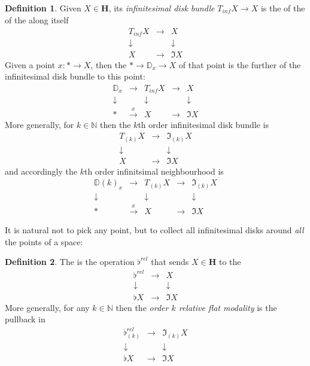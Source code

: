 \documentclass[12pt,titlepage]{article}
\newcommand{\itexarray}[1]{\begin{matrix}#1\end{matrix}}
\theoremstyle{plain}
\theoremstyle{definition}
\newtheorem{defn}{Definition}
\theoremstyle{remark}
\begin{document}
\begin{defn}
\label{InfinitesimalDiskBundle}\hypertarget{InfinitesimalDiskBundle}{}
Given $X \in \mathbf{H}$, its \emph{infinitesimal disk bundle} $T_{inf} X\to X$ is the  of the  of the  along itself
\begin{displaymath}
\itexarray{
T_{inf} X &\stackrel{}{\longrightarrow}& X
\\
\downarrow && \downarrow
\\
X &\longrightarrow& \Im X
}
\end{displaymath}
Given a point $x \colon  \ast \to X$, then the  $\ast \to \mathbb{D}_x \to X$ of that point is the further  of the infinitesimal disk bundle to this point:
\begin{displaymath}
\itexarray{
\mathbb{D}_x &\longrightarrow & T_{inf} X &\stackrel{}{\longrightarrow}& X
\\
\downarrow && \downarrow && \downarrow
\\
\ast &\stackrel{x}{\longrightarrow} & X &\longrightarrow& \Im X
}
\end{displaymath}
More generally, for $k \in \mathbb{N}$ then the $k$th order infinitesimal disk bundle is
\begin{displaymath}
\itexarray{
T_{(k)} X &\stackrel{}{\longrightarrow}& \Im_{(k)} X
\\
\downarrow && \downarrow
\\
X &\longrightarrow& \Im X
}
\end{displaymath}
and accordingly the $k$th order infinitsimal neighbourhood is
\begin{displaymath}
\itexarray{
\mathbb{D}(k)_x &\longrightarrow & T_{(k)} X &\stackrel{}{\longrightarrow}& \Im_{(k)}X
\\
\downarrow && \downarrow && \downarrow
\\
\ast &\stackrel{x}{\longrightarrow} & X &\longrightarrow& \Im X
}
\end{displaymath}
\end{defn}
It is natural not to pick any point, but to collect all infinitesimal disks around \emph{all} the points of a space:
\begin{defn}
\label{RelativeFlat}\hypertarget{RelativeFlat}{}
The  is the operation $\flat^{rel}$ that sends $X \in \mathbf{H}$ to the 
\begin{displaymath}
\itexarray{
\flat^{rel} &\longrightarrow& X
\\
\downarrow && \downarrow
\\
\flat X &\longrightarrow& \Im X
}
\end{displaymath}
More generally, for any $k \in \mathbb{N}$ then the \emph{order $k$ relative flat modality} is the pullback in
\begin{displaymath}
\itexarray{
\flat^{rel}_{(k)} &\longrightarrow& \Im_{(k)} X
\\
\downarrow && \downarrow
\\
\flat X &\longrightarrow& \Im X
}
\end{displaymath}
\end{defn}
\end{document}
